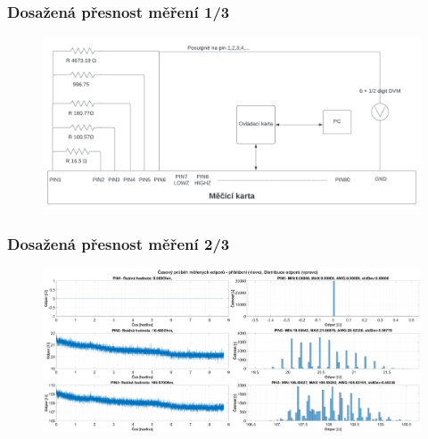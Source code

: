 \documentclass[%
  12pt,       				%
	t,                  %
	aspectratio=1610,   %
	unicode,						%
]{beamer}				    	%
\begin{document}
\begin{frame} 
	\frametitle{Dosažená přesnost měření 1/3}

	\begin{figure}[ht!]
		\centering
		\includegraphics[width = \textwidth]{obrazky/10hourTestScheme.png}
	\end{figure}
\end{frame}

\begin{frame} 
	\frametitle{Dosažená přesnost měření 2/3}

	\begin{figure}[ht!]
		\centering
		\includegraphics[width = \textwidth]{obrazky/matlab_generated/VOLTAGE_TESTER/dlouhodoba_stabilita_resistor_part1_obhj.eps}
	\end{figure}
\end{frame}
\end{document}
